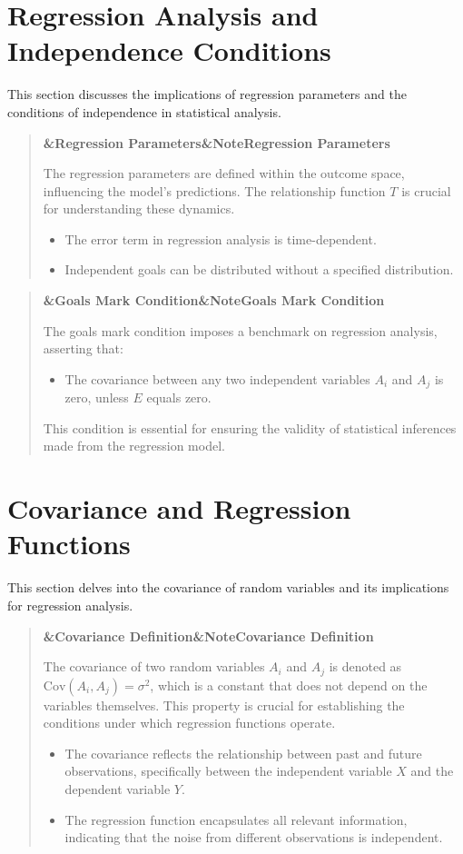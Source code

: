 \documentclass[a4paper]{article}
\newcommand{\boxheading}[1]{%
  \par\smallskip
  \noindent\textbf{\ifx&#1&Note\else#1\fi}\par
  \smallskip
}
\newenvironment{defbox}[1][]{%
  \begin{quote}\color{green!40!black}\boxheading{#1}\normalcolor
}{\end{quote}}
\newenvironment{rembox}[1][]{%
  \begin{quote}\color{black!70}\boxheading{#1}\normalcolor
}{\end{quote}}
\begin{document}
\section{Regression Analysis and Independence Conditions}
This section discusses the implications of regression parameters and the conditions of independence in statistical analysis.

\begin{rembox}[Regression Parameters]
The regression parameters are defined within the outcome space, influencing the model's predictions. The relationship function \( T \) is crucial for understanding these dynamics.

\begin{itemize}
    \item The error term in regression analysis is time-dependent.
    \item Independent goals can be distributed without a specified distribution.
\end{itemize}
\end{rembox}

\begin{defbox}[Goals Mark Condition]
The goals mark condition imposes a benchmark on regression analysis, asserting that:
\begin{itemize}
    \item The covariance between any two independent variables \( A_i \) and \( A_j \) is zero, unless \( E \) equals zero.
\end{itemize}
This condition is essential for ensuring the validity of statistical inferences made from the regression model.
\end{defbox}

\section{Covariance and Regression Functions}
This section delves into the covariance of random variables and its implications for regression analysis.

\begin{rembox}[Covariance Definition]
The covariance of two random variables \( A_i \) and \( A_j \) is denoted as \( \text{Cov}(A_i, A_j) = \sigma^2 \), which is a constant that does not depend on the variables themselves. This property is crucial for establishing the conditions under which regression functions operate.

\begin{itemize}
    \item The covariance reflects the relationship between past and future observations, specifically between the independent variable \( X \) and the dependent variable \( Y \).
    \item The regression function encapsulates all relevant information, indicating that the noise from different observations is independent.
\end{itemize}
\end{rembox}
\end{document}
